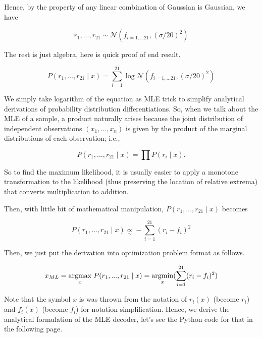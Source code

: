 \documentclass[12pt]{amsart}
\begin{document}
Hence, by the property of any linear combination of Gaussian is Gaussian, we have

\begin{equation}
    r_1,...,r_{21} \sim  \mathcal{N}(f_{i = 1,...21},(\sigma / 20)^2)
\end{equation}

The rest is just algebra, here is quick proof of end result.


\begin{equation*}
   P(r_1,...,r_{21}\mid x) = \sum_{i=1}^{21} \log{\mathcal{N}(f_{i = 1,...21},(\sigma / 20)^2)}
\end{equation*}

We simply take logarithm of the equation as MLE trick to simplify analytical derivations of probability distribution differentiations. So, when we talk about the MLE of a sample, a product naturally arises because the joint distribution of independent observations $(x_1,…,x_n)$ is given by the product of the marginal distributions of each observation; i.e.,

\begin{equation}
    P(r_1,...,r_{21} \mid x) = \prod P(r_i \mid x).
\end{equation}

So to find the maximum likelihood, it is usually easier to apply a monotone transformation to the likelihood (thus preserving the location of relative extrema) that converts multiplication to addition. 

\bigskip
Then, with little bit of mathematical manipulation, $P(r_1,...,r_{21} \mid x)$ becomes

\begin{equation}
    P(r_1,...,r_{21} \mid x) \underset{\sim}{\propto}  - \sum_{i=1}^{21} (r_i - f_i)^2
\end{equation}

Then, we just put the derivation into optimization problem format as follows.

\begin{equation}
    x_{ML} =  \underset{x}{\mathrm{argmax}} \hspace{1mm} P(r_1,...,r_{21}\mid x) = \underset{x}{\mathrm{argmin}} (\sum_{i=1}^{21} (r_i - f_i)^2)
\end{equation}

Note that the symbol $x$ is was thrown from the notation of $r_i(x)$ (become $r_i$) and $f_i(x)$  (become $f_i$) for notation simplification. Hence, we derive the analytical formulation of the MLE decoder, let's see the Python code for that in the following page.
\end{document}
